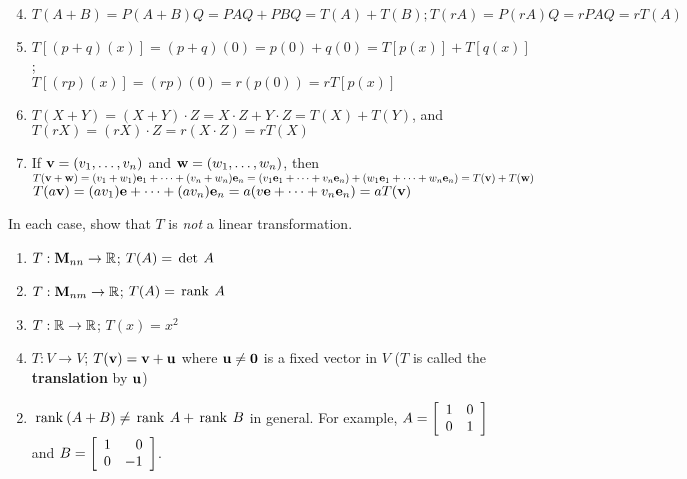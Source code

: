 \begin{multicols}{2}
\begin{ex}
\begin{sol}
\begin{enumerate}[label={\alph*.}]
\setcounter{enumi}{3}
\item $T(A + B) = P(A + B)Q = PAQ + PBQ = T(A) + T(B); T(rA) = P(rA)Q = rPAQ = rT(A)$

\setcounter{enumi}{5}
\item $T\left[(p + q)(x)\right] = (p + q)(0) = p(0) + q(0) = T\left[p(x)\right] + T\left[q(x)\right]$;\\
$T\left[(rp)(x)\right] = (rp)(0) = r(p(0)) = rT\left[p(x)\right]$

\setcounter{enumi}{7}
\item $T(X + Y) = (X + Y) \cdot Z = X \cdot Z + Y \cdot Z = T(X) + T(Y)$, and $T(rX) = (rX) \cdot Z = r(X \cdot Z) = rT(X)$
   
\setcounter{enumi}{9}
\item If $\textbf{v} = (v_1, \dots, v_n)$ and $\textbf{w} = (w_1, \dots, w_n)$, then $T(\textbf{v} + \textbf{w}) = (v_1 + w_1)\textbf{e}_1 + \cdots + (v_n + w_n)\textbf{e}_n = (v_1\textbf{e}_1 + \cdots + v_n\textbf{e}_n) + (w_1\textbf{e}_1 + \cdots + w_n\textbf{e}_n) = T(\textbf{v}) + T(\textbf{w})$\\
$T(a\textbf{v}) = (av_1)\textbf{e} + \cdots + (av_n)\textbf{e}_n = a(v\textbf{e} + \cdots + v_n\textbf{e}_n) = aT(\textbf{v})$

\end{enumerate}
\end{sol}
\end{ex}

\begin{ex}
In each case, show that $T$ is \textit{not} a linear transformation.


\begin{enumerate}[label={\alph*.}]
\item $T : \textbf{M}_{nn} \to \mathbb{R}$; $T(A) = \thinspace\operatorname{det \medspace}A$

\item $T : \textbf{M}_{nm} \to \mathbb{R}$; $T(A) = \thinspace\operatorname{rank \medspace}A$

\item $T : \mathbb{R} \to \mathbb{R}$; $T(x) = x^{2}$

\item $T : V \to V$; $T(\textbf{v}) = \textbf{v} + \textbf{u}$ where $\textbf{u} \neq \textbf{0}$ is a fixed vector in $V$ ($T$ is called the \textbf{translation} by $\textbf{u}$)

\end{enumerate}
\begin{sol}
\begin{enumerate}[label={\alph*.}]
\setcounter{enumi}{1}
\item $\thinspace\operatorname{rank\medspace}(A + B) \neq \thinspace\operatorname{rank \medspace}A + \thinspace\operatorname{rank \medspace}B$ in general. For example, $A = \left[ \begin{array}{rr}
1 & 0 \\
0 & 1
\end{array} \right]$
 and $B = \left[ \begin{array}{rr}
 1 & 0 \\
 0 & -1
 \end{array} \right]$.


\end{enumerate}
\end{sol}
\end{ex}
\end{multicols}
